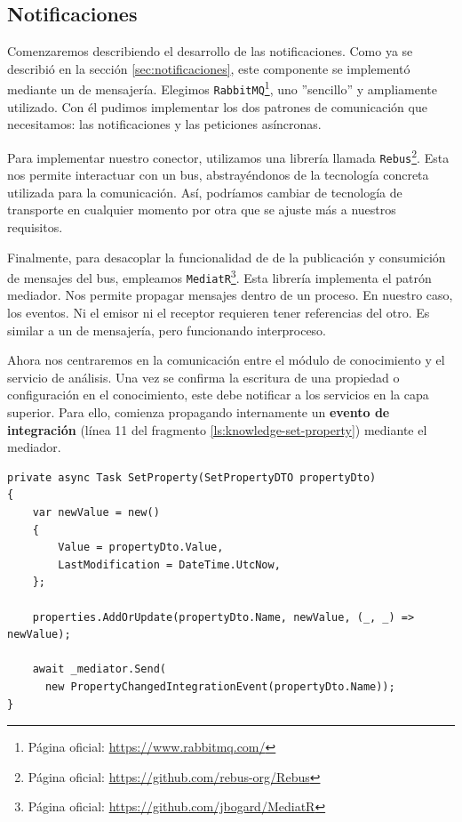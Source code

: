 \subsection{Notificaciones}

Comenzaremos describiendo el desarrollo de las notificaciones. Como ya se describió en la sección \ref{sec:notificaciones}, este componente se implementó mediante un  de mensajería. Elegimos \texttt{RabbitMQ}\footnote{Página oficial: \url{https://www.rabbitmq.com/}}, uno ''sencillo'' y ampliamente utilizado. \cite{newmanBuildingMicroservicesDesigning2021} Con él pudimos  implementar los dos patrones de comunicación que necesitamos: las notificaciones y las peticiones asíncronas.

Para implementar nuestro conector, utilizamos una librería llamada \texttt{Rebus}\footnote{Página oficial: \url{https://github.com/rebus-org/Rebus}}. Esta nos permite interactuar con un bus, abstrayéndonos de la tecnología concreta utilizada para la comunicación. Así, podríamos cambiar de tecnología de transporte en cualquier momento por otra que se ajuste más a nuestros requisitos.

Finalmente, para desacoplar la funcionalidad de de la publicación y consumición de mensajes del bus, empleamos \texttt{MediatR}\footnote{Página oficial: \url{https://github.com/jbogard/MediatR}}. Esta librería implementa el patrón mediador. Nos permite propagar mensajes dentro de un proceso. En nuestro caso, los eventos. Ni el emisor ni el receptor requieren tener referencias del otro. Es similar a un  de mensajería, pero funcionando interproceso.

Ahora nos centraremos en la comunicación entre el módulo de conocimiento y el servicio de análisis. Una vez se confirma la escritura de una propiedad o configuración en el conocimiento, este debe notificar a los servicios en la capa superior. Para ello, comienza propagando internamente un \textbf{evento de integración} (línea 11 del fragmento \ref{ls:knowledge-set-property}) mediante el mediador.


\begin{lstlisting}[language={[Sharp]C},caption={Implementación del método que asigna valor a una propiedad. Muestra un ejemplo de propagación interna de eventos de integración.},captionpos=b, label=ls:knowledge-set-property]
private async Task SetProperty(SetPropertyDTO propertyDto)
{
    var newValue = new()
    {
        Value = propertyDto.Value,
        LastModification = DateTime.UtcNow,
    };

    properties.AddOrUpdate(propertyDto.Name, newValue, (_, _) => newValue);

    await _mediator.Send(
      new PropertyChangedIntegrationEvent(propertyDto.Name));
}

\end{lstlisting}

